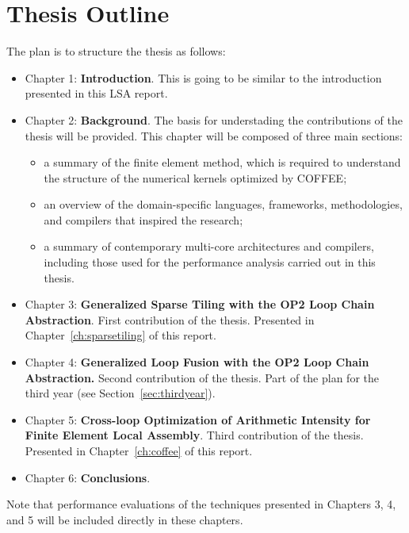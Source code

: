 \section{Thesis Outline}
The plan is to structure the thesis as follows:
\begin{itemize}
\item Chapter 1: \textbf{Introduction}. This is going to be similar to the introduction presented in this LSA report.
\item Chapter 2: \textbf{Background}. The basis for understading the contributions of the thesis will be provided. This chapter will be composed of three main sections:
\begin{itemize}
\item a summary of the finite element method, which is required to understand the structure of the numerical kernels optimized by COFFEE;
\item an overview of the domain-specific languages, frameworks, methodologies, and compilers that inspired the research;
\item a summary of contemporary multi-core architectures and compilers, including those used for the performance analysis carried out in this thesis.
\end{itemize}
\item Chapter 3: \textbf{Generalized Sparse Tiling with the OP2 Loop Chain Abstraction}. First contribution of the thesis. Presented in Chapter~\ref{ch:sparsetiling} of this report.
\item Chapter 4: \textbf{Generalized Loop Fusion with the OP2 Loop Chain Abstraction.} Second contribution of the thesis. Part of the plan for the third year (see Section~\ref{sec:thirdyear}).
\item Chapter 5: \textbf{Cross-loop Optimization of Arithmetic Intensity for Finite Element Local Assembly}. Third contribution of the thesis. Presented in Chapter~\ref{ch:coffee} of this report.
\item Chapter 6: \textbf{Conclusions}. 
\end{itemize}
Note that performance evaluations of the techniques presented in Chapters 3, 4, and 5 will be included directly in these chapters.